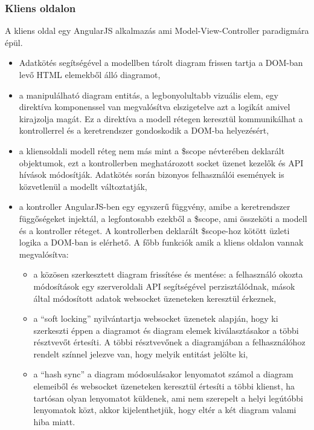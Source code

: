 \subsubsection{Kliens oldalon}

A kliens oldal egy AngularJS alkalmazás ami Model-View-Controller paradigmára épül.  


\begin{itemize}
\item Adatkötés segítségével a modellben tárolt diagram frissen tartja a DOM-ban levő HTML elemekből álló diagramot, 
\item a manipulálható diagram entitás, a legbonyolultabb vizuális elem, egy direktíva komponenssel van megvalósítva elszigetelve azt a logikát amivel kirajzolja magát. Ez a direktíva a modell rétegen keresztül kommunikálhat a kontrollerrel és a keretrendszer gondoskodik a DOM-ba helyezésért,
\item a kliensoldali modell réteg nem más mint a \$scope névterében deklarált objektumok, ezt a kontrollerben meghatározott socket üzenet kezelők és API hívások módosítják. Adatkötés során bizonyos felhasználói események is közvetlenül a modellt változtatják,
\item a kontroller AngularJS-ben egy egyszerű függvény, amibe a keretrendszer függőségeket injektál, a legfontosabb ezekből a \$scope, ami összeköti a modell és a kontroller réteget. A kontrollerben deklarált \$scope-hoz kötött üzleti logika a DOM-ban is elérhető. A főbb funkciók amik a kliens oldalon vannak megvalósítva:
    \begin{itemize} 
    \item a közösen szerkesztett diagram frissítése és mentése: a felhasználó okozta módosítások egy szerveroldali API segítségével perzisztálódnak, mások által módosított adatok websocket üzeneteken keresztül érkeznek, 
    \item a ``soft locking'' nyilvántartja websocket üzenetek alapján, hogy ki szerkeszti éppen a diagramot és diagram elemek kiválasztásakor a többi résztvevőt értesíti. A többi résztvevőnek a diagramjában a felhasználóhoz rendelt színnel jelezve van, hogy melyik entitást jelölte ki,
    \item a ``hash sync'' a diagram módosulásakor lenyomatot számol a diagram elemeiből és websocket üzeneteken keresztül értesíti a többi klienst, ha tartósan olyan lenyomatot küldenek, ami nem szerepelt a helyi legútóbbi lenyomatok közt, akkor kijelenthetjük, hogy eltér a két diagram valami hiba miatt. 
    \end{itemize}
\end{itemize}

